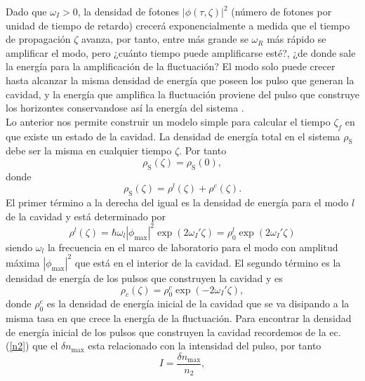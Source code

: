 Dado que $\omega_I>0$, la densidad de fotones $|\phi(\tau,\zeta)|^2$ (n\'{u}mero de fotones por unidad de tiempo de retardo) crecer\'{a} exponencialmente a medida que el tiempo de propagaci\'{o}n $\zeta$ avanza, por tanto, entre m\'as grande se $\omega_R$ m\'as r\'apido se amplificar el modo, pero ¿cu\'{a}nto tiempo puede amplificarse est\'e?, ¿de donde sale la energ\'{i}a para la amplificaci\'{o}n de la fluctuaci\'{o}n? El modo solo puede crecer hasta alcanzar la misma densidad de energ\'{i}a que poseen los pulso que generan la cavidad, y la energ\'{i}a que amplifica la fluctuaci\'{o}n proviene del pulso que construye los horizontes conservandose as\'{i} la energ\'{i}a del sistema .\\ 

Lo anterior nos permite construir un modelo simple para calcular el tiempo $\zeta_f$ en que existe un estado de la cavidad. La densidad de energ\'{i}a total en el sistema $\rho_{\text{S}}$ debe ser la misma en cualquier tiempo  $\zeta$. Por tanto
\begin{equation}\label{ec:49}
\rho_{\text{S}}(\zeta)=\rho_{\text{S}}(0),
\end{equation}
donde 
\begin{equation}\label{ec:50}
\rho_{\text{S}}(\zeta)=\rho^l(\zeta)+\rho^c(\zeta).
\end{equation}
El primer t\'{e}rmino a la derecha del igual es la densidad de energ\'{i}a para el modo $l$ de la cavidad y est\'a determinado por
\begin{equation}\label{ec:51}
\rho^l(\zeta)=\hbar \omega_l|\phi_{\text{max}}|^2\exp(2\omega_I'\zeta)=\rho_0^l\exp(2\omega_I'\zeta)
\end{equation}
siendo $\omega_l$ la frecuencia en el marco de laboratorio para el modo con amplitud m\'{a}xima $|\phi_{\text{max}}|^2$ que est\'a en el interior de la cavidad. El segundo t\'{e}rmino es la densidad de energ\'{i}a de los pulsos que construyen la cavidad y es
\begin{equation}\label{ec:52}
\rho_c(\zeta) =\rho_0^c\exp(-2\omega_{I}'\zeta),
\end{equation}
donde $\rho_0^c$ es la densidad de energ\'{i}a inicial de la cavidad que se va disipando a la misma tasa en que crece la energ\'{i}a de la fluctuaci\'{o}n. Para encontrar la densidad de energ\'{i}a inicial de los pulsos que construyen la cavidad recordemos de la ec. (\ref{n2}) que el $\delta n_{\text{max}}$ esta relacionado con la intensidad del pulso, por tanto
\begin{equation}
I=\frac{\delta n_{\text{max}}}{n_2},
\end{equation}
